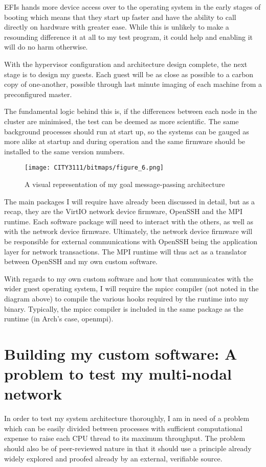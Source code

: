 EFIs hands more device access over to the operating system in the early stages of booting which means that they start up faster and have the ability to call directly on hardware with greater ease. While this is unlikely to make a resounding difference it at all to my test program, it could help and enabling it will do no harm otherwise.
\vfill\break

\textbf{}

With the hypervisor configuration and architecture design complete, the next stage is to design my guests. Each guest will be as close as possible to a carbon copy of one-another, possible through last minute imaging of each machine from a preconfigured master.

The fundamental logic behind this is, if the differences between each node in the cluster are minimised, the test can be deemed as more scientific. The same background processes should run at start up, so the systems can be gauged as more alike at startup and during operation and the same firmware should be installed to the same version numbers.

\begin{figure}[H]
    \texttt{[image: CITY3111/bitmaps/figure\_6.png]}
    \caption{A visual representation of my goal message-passing architecture}
    \label{figure_6}
\end{figure}

The main packages I will require have already been discussed in detail, but as a recap, they are the VirtIO network device firmware, OpenSSH and the MPI runtime. Each software package will need to interact with the others, as well as with the network device firmware. Ultimately, the network device firmware will be responsible for external communications with OpenSSH being the application layer for network transactions. The MPI runtime will thus act as a translator between OpenSSH and my own custom software.

With regards to my own custom software and how that communicates with the wider guest operating system, I will require the mpicc compiler (not noted in the diagram above) to compile the various hooks required by the runtime into my binary. Typically, the mpicc compiler is included in the same package as the runtime (in Arch's case, openmpi).

\section{Building my custom software: A problem to test my multi-nodal network}
In order to test my system architecture thoroughly, I am in need of a problem which can be easily divided between processes with sufficient computational expense to raise each CPU thread to its maximum throughput. The problem should also be of peer-reviewed nature in that it should use a principle already widely explored and proofed already by an external, verifiable source.

